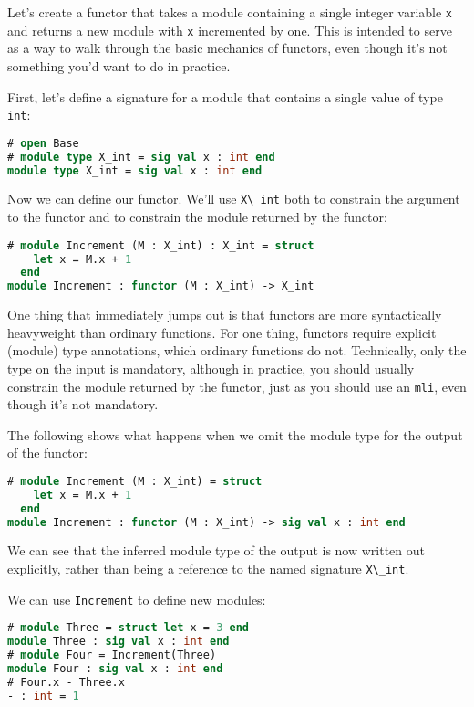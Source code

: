 Let's create a functor that takes a module containing a single integer
variable \passthrough{\lstinline!x!} and returns a new module with
\passthrough{\lstinline!x!} incremented by one. This is intended to
serve as a way to walk through the basic mechanics of functors, even
though it's not something you'd want to do in practice.

First, let's define a signature for a module that contains a single
value of type \passthrough{\lstinline!int!}:

\begin{lstlisting}[language=Caml]
# open Base
# module type X_int = sig val x : int end
module type X_int = sig val x : int end
\end{lstlisting}

Now we can define our functor. We'll use
\passthrough{\lstinline!X\_int!} both to constrain the argument to the
functor and to constrain the module returned by the functor:

\begin{lstlisting}[language=Caml]
# module Increment (M : X_int) : X_int = struct
    let x = M.x + 1
  end
module Increment : functor (M : X_int) -> X_int
\end{lstlisting}

One thing that immediately jumps out is that functors are more
syntactically heavyweight than ordinary functions. For one thing,
functors require explicit (module) type annotations, which ordinary
functions do not. Technically, only the type on the input is mandatory,
although in practice, you should usually constrain the module returned
by the functor, just as you should use an \passthrough{\lstinline!mli!},
even though it's not mandatory.

The following shows what happens when we omit the module type for the
output of the functor:

\begin{lstlisting}[language=Caml]
# module Increment (M : X_int) = struct
    let x = M.x + 1
  end
module Increment : functor (M : X_int) -> sig val x : int end
\end{lstlisting}

We can see that the inferred module type of the output is now written
out explicitly, rather than being a reference to the named signature
\passthrough{\lstinline!X\_int!}.

We can use \passthrough{\lstinline!Increment!} to define new modules:

\begin{lstlisting}[language=Caml]
# module Three = struct let x = 3 end
module Three : sig val x : int end
# module Four = Increment(Three)
module Four : sig val x : int end
# Four.x - Three.x
- : int = 1
\end{lstlisting}

